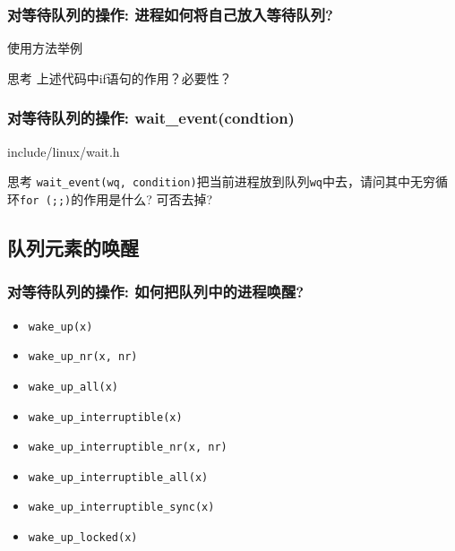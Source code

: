 \documentclass[xcolor=svgnames]{beamer}
\begin{document}
\begin{CJK*}{UTF8}{gbsn}
\begin{frame}[fragile]
\frametitle{对等待队列的操作: 进程如何将自己放入等待队列?}
\begin{block}{使用方法举例}
\lstspreparetowait
\end{block}
\begin{block}{思考}
上述代码中if语句的作用？必要性？
\end{block}
\end{frame}

\begin{frame}[fragile]
\frametitle{对等待队列的操作: wait\_event(condtion)}
\begin{block}{include/linux/wait.h}
\lstwaitevent
\end{block}
\begin{block}{思考}
\verb|wait_event(wq, condition)|把当前进程放到队列\verb|wq|中去，请问其中无穷循环\verb|for (;;)|的作用是什么? 可否去掉?
\end{block}
\end{frame}

\subsection{队列元素的唤醒}

\begin{frame}[fragile]
\frametitle{对等待队列的操作: 如何把队列中的进程唤醒?}
\begin{itemize}
\item \verb|wake_up(x)|
\item \verb|wake_up_nr(x, nr)|
\item \verb|wake_up_all(x)|
\item \verb|wake_up_interruptible(x)|
\item \verb|wake_up_interruptible_nr(x, nr)|
\item \verb|wake_up_interruptible_all(x)|
\item \verb|wake_up_interruptible_sync(x)|
\item \verb|wake_up_locked(x)|
\end{itemize}
\end{frame}


\end{CJK*}
\end{document}
